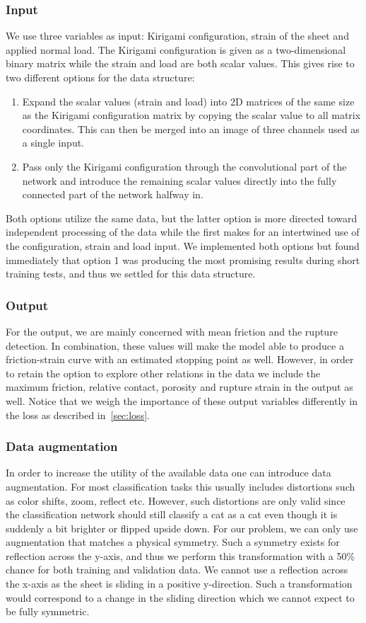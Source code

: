 \subsubsection{Input}
We use three variables as input: Kirigami configuration, strain of the sheet
and applied normal load. The Kirigami configuration is given as a two-dimensional binary matrix while the strain and load are both scalar values. This gives rise to two different options for the data structure:
\begin{enumerate}
  \item Expand the scalar values (strain and load) into 2D matrices of the same
  size as the Kirigami configuration matrix by copying the scalar value to all matrix coordinates. This can then be merged into an image of three channels used as a single input.  
  \item Pass only the Kirigami configuration through the convolutional part of the network and introduce the remaining scalar values directly into the fully connected part of the network halfway in. 
\end{enumerate}
Both options utilize the same data, but the latter option is more directed toward independent processing of the data while the first makes for an intertwined use of the configuration, strain and load input. We implemented both options but found immediately that option 1 was producing the most promising results during short training tests, and thus we settled for this data structure. 

\subsubsection{Output}
For the output, we are mainly concerned with mean friction and the rupture
detection. In combination, these values will make the model able to produce a friction-strain curve with an estimated stopping point as well. However, in order to retain the option to explore other relations in the data we include the maximum friction, relative contact, porosity and rupture strain in the output as well. Notice that we weigh the importance of these output variables differently in the loss as described in~\cref{sec:loss}. 


\subsubsection{Data augmentation}
In order to increase the utility of the available data one can introduce data
augmentation. For most classification tasks this usually includes distortions
such as color shifts, zoom, reflect etc. However, such distortions are only valid
since the classification network should still classify a cat as a cat even
though it is suddenly a bit brighter or flipped upside down. For our problem, we
can only use augmentation that matches a physical symmetry. Such a symmetry
exists for reflection across the y-axis, and thus we perform this transformation
with a 50\% chance for both training and validation data. We cannot use a reflection
across the x-axis as the sheet is sliding in a positive y-direction. Such a
transformation would correspond to a change in the sliding direction which we
cannot expect to be fully symmetric. 



